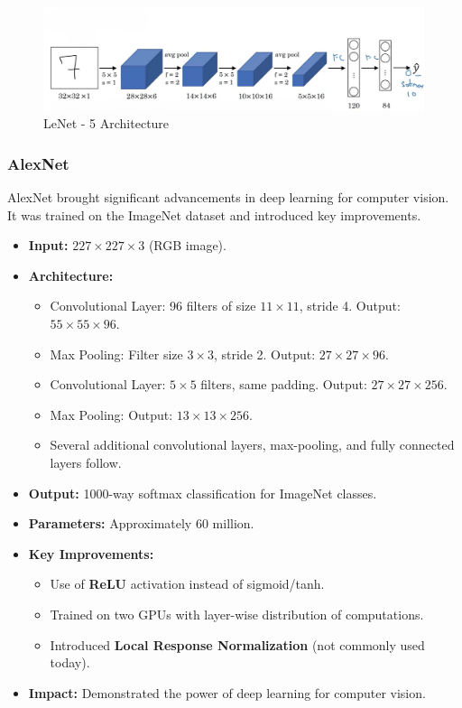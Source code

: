 \documentclass[letterpaper,12pt,notitlepage,twoside]{report}
\begin{document}
\begin{figure}[h]
	\centering
	\includegraphics[width=\textwidth]{Images/LeNet-5.png}
	\caption{LeNet - 5 Architecture}
	\label{fig:32}
\end{figure}

\FloatBarrier

\subsubsection{AlexNet}
AlexNet brought significant advancements in deep learning for computer vision. It was trained on the ImageNet dataset and introduced key improvements.
\begin{itemize}
    \item \textbf{Input:} $227 \times 227 \times 3$ (RGB image).
    \item \textbf{Architecture:}
    \begin{itemize}
        \item Convolutional Layer: 96 filters of size $11 \times 11$, stride 4. Output: $55 \times 55 \times 96$.
        \item Max Pooling: Filter size $3 \times 3$, stride 2. Output: $27 \times 27 \times 96$.
        \item Convolutional Layer: $5 \times 5$ filters, same padding. Output: $27 \times 27 \times 256$.
        \item Max Pooling: Output: $13 \times 13 \times 256$.
        \item Several additional convolutional layers, max-pooling, and fully connected layers follow.
    \end{itemize}
    \item \textbf{Output:} 1000-way softmax classification for ImageNet classes.
    \item \textbf{Parameters:} Approximately 60 million.
    \item \textbf{Key Improvements:}
    \begin{itemize}
        \item Use of \textbf{ReLU} activation instead of sigmoid/tanh.
        \item Trained on two GPUs with layer-wise distribution of computations.
        \item Introduced \textbf{Local Response Normalization} (not commonly used today).
    \end{itemize}
    \item \textbf{Impact:} Demonstrated the power of deep learning for computer vision.
\end{itemize}
\end{document}
